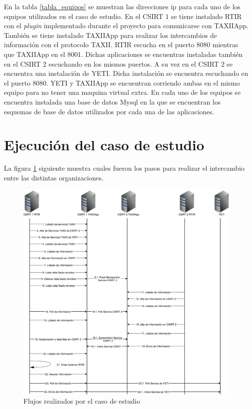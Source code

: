 En la tabla \ref{tabla_equipos} se muestran las direcciones ip para cada uno de los equipos utilizados en el caso de estudio. En el CSIRT 1 se tiene instalado RTIR con el \textit{plugin} implementado durante el proyecto para comunicarse con TAXIIApp. También se tiene instalado TAXIIApp para realizar los intercambios de información con el protocolo TAXII. RTIR escucha en el puerto 8080 mientras que TAXIIApp en el 8001.
Dichas aplicaciones se encuentras instaladas también en el CSIRT 2 escuchando en los mismos puertos. A su vez en el CSIRT 2 se encuentra una instalación de YETI. Dicha instalación se encuentra escuchando en el puerto 8080. YETI y TAXIIApp se encuentran corriendo ambas en el mismo equipo para no tener una maquina virtual extra.
En cada uno de los equipos se encuentra instalada una base de datos Mysql en la que se encuentran los esquemas de base de datos utilizados por cada una de las aplicaciones.

\section{Ejecución del caso de estudio}
La figura \ref{fig.flujos} siguiente muestra cuales fueron los pasos para realizar el intercambio entre las distintas organizaciones.

\begin{figure}[H]
	\centering
	\includegraphics[scale=0.35]{caso-de-estudio/flujos.png}
	\caption{Flujos realizados por el caso de estudio}
	\label{fig.flujos}
\end{figure}

